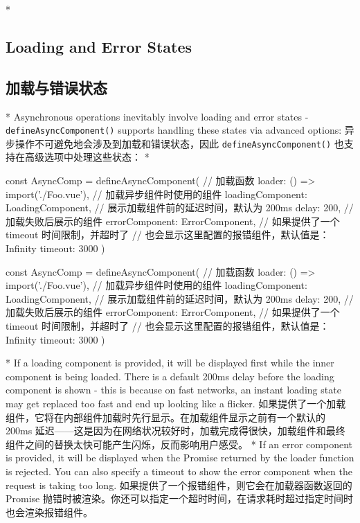 \begin{paracol}{2}
 
\switchcolumn[0]*%
\subsection{Loading and Error States}
\switchcolumn
\subsection{加载与错误状态}
\switchcolumn[0]*%
Asynchronous operations inevitably involve loading and error states -
\texttt{defineAsyncComponent()} supports handling these states via
advanced options:
\switchcolumn
异步操作不可避免地会涉及到加载和错误状态，因此
\texttt{defineAsyncComponent()} 也支持在高级选项中处理这些状态：
\switchcolumn[0]*%
\begin{codeJs}
const AsyncComp = defineAsyncComponent({
  // 加载函数
  loader: () => import('./Foo.vue'),
  // 加载异步组件时使用的组件
  loadingComponent: LoadingComponent,
  // 展示加载组件前的延迟时间，默认为 200ms
  delay: 200,
  // 加载失败后展示的组件
  errorComponent: ErrorComponent,
  // 如果提供了一个 timeout 时间限制，并超时了
  // 也会显示这里配置的报错组件，默认值是：Infinity
  timeout: 3000
})
\end{codeJs}
\switchcolumn
\begin{codeJs}
const AsyncComp = defineAsyncComponent({
  // 加载函数
  loader: () => import('./Foo.vue'),
  // 加载异步组件时使用的组件
  loadingComponent: LoadingComponent,
  // 展示加载组件前的延迟时间，默认为 200ms
  delay: 200,
  // 加载失败后展示的组件
  errorComponent: ErrorComponent,
  // 如果提供了一个 timeout 时间限制，并超时了
  // 也会显示这里配置的报错组件，默认值是：Infinity
  timeout: 3000
})
\end{codeJs}
\switchcolumn[0]*%
If a loading component is provided, it will be displayed first while the
inner component is being loaded. There is a default 200ms delay before
the loading component is shown - this is because on fast networks, an
instant loading state may get replaced too fast and end up looking like
a flicker.
\switchcolumn
如果提供了一个加载组件，它将在内部组件加载时先行显示。在加载组件显示之前有一个默认的
200ms
延迟------这是因为在网络状况较好时，加载完成得很快，加载组件和最终组件之间的替换太快可能产生闪烁，反而影响用户感受。
\switchcolumn[0]*%
If an error component is provided, it will be displayed when the Promise
returned by the loader function is rejected. You can also specify a
timeout to show the error component when the request is taking too long.
\switchcolumn
如果提供了一个报错组件，则它会在加载器函数返回的 Promise
抛错时被渲染。你还可以指定一个超时时间，在请求耗时超过指定时间时也会渲染报错组件。
\end{paracol}

